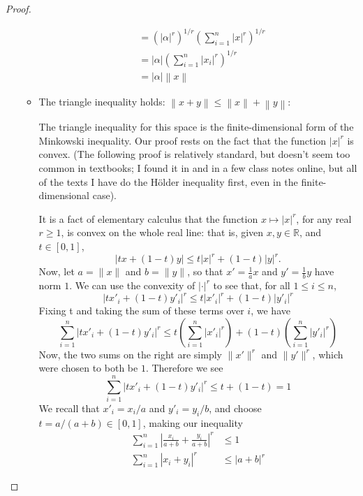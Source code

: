 \documentclass[12pt]{article}
\newcommand{\R}{\mathbb{R}}
\theoremstyle{definition}
\begin{document}
\begin{proof}
\begin{enumerate}[label=(\roman*)]
\begin{itemize}
\begin{align*}
				&= \left( \left \lvert { \alpha } \right \lvert^r \right)^{1/r} \left( \sum_{i=1}^n \left \lvert { x } \right \lvert ^r \right)^{1/r}\\
				&= \left \lvert { \alpha } \right \lvert \left( \sum_{i=1}^n \left \lvert { x_i } \right \lvert ^r \right)^{1/r}\\
				&= \left \lvert { \alpha } \right \lvert \left \lVert { x } \right \lVert 
			\end{align*}
		\item The triangle inequality holds: $\left \lVert { x + y } \right \lVert  \leq \left \lVert { x } \right \lVert  + \left \lVert {  y } \right \lVert $: 
			\par The triangle inequality for this space is the finite-dimensional form of the Minkowski inequality. Our proof rests on the fact that the function $\lvert x \rvert^r$ is convex. (The following proof is relatively standard, but doesn't seem too common in textbooks; I found it in \cite{convex} and in a few class notes online, but all of the texts I have do the H\"older inequality first, even in the finite-dimensional case).
			\par It is a fact of elementary calculus that the function $x \mapsto \lvert x\rvert ^r$, for any real $r \geq 1$, is convex on the whole real line: that is, given $x, y\in \R$, and $t \in [0,1]$, 
			\[\lvert tx + (1-t)y \rvert \leq t\lvert x\rvert^r + (1-t)\lvert y \rvert ^r.\]
			Now, let $a = \lVert x \rVert$ and $b = \lVert y \rVert$, so that $x' = \frac{1}{a} x$ and $y' = \frac{1}{b} y$ have norm $1$. We can use the convexity of $\lvert \cdot \rvert^r$ to see that, for all $1 \leq i \leq n$,
			\[
			    \lvert t x'_i + (1 - t) y'_i \rvert^r \leq t \lvert x'_i \rvert^r + (1-t) \lvert y'_i \rvert^r
			\]
			Fixing t and taking the sum of these terms over $i$, we have
			\[
			 \sum_{i=1}^n \lvert t x'_i + (1 - t) y'_i \rvert^r \leq t\left ( \sum_{i=1}^n \lvert x'_i \rvert^r \right ) + (1-t) \left ( \sum_{i=1}^n\lvert y'_i \rvert^r \right )
			\]
			Now, the two sums on the right are simply $\lVert x' \rVert^r$ and $\lVert y' \rVert^r$, which were chosen to both be $1$. Therefore we see
			\[
			\sum_{i=1}^n \lvert t x'_i + (1 - t) y'_i \rvert^r \leq t + (1-t) = 1
			\]
			We recall that $x'_i = x_i/a$ and $y'_i = y_i/b$, and choose $t = a/(a+b) \in [0,1]$, making our inequality
			\begin{align*}
				\sum_{i=1}^n \left \lvert { \frac{x_i}{a+b} + \frac{y_i}{a+b} } \right \lvert^r &\leq 1\\
				\sum_{i=1}^n \left \lvert { x_i + y_i } \right \lvert^r &\leq \left \lvert { a+b } \right \lvert^r 

\end{align*}
\end{itemize}
\end{enumerate}
\end{proof}
\end{document}
